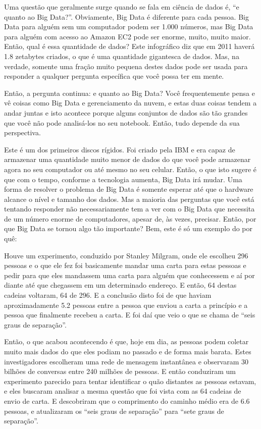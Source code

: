 \begin{multicols}{2}
\begin{footnotesize}
Uma questão que geralmente surge quando se fala em ciência de dados é, ``e quanto ao Big Data?''. Obviamente, Big Data é diferente para cada pessoa. Big Data para alguém sem um computador podem ser 1.000 números, mas Big Data para alguém com acesso ao Amazon EC2 pode ser enorme, muito, muito maior. Então, qual é essa quantidade de dados? Este infográfico diz que em 2011 haverá 1.8 zetabytes criados, o que é uma quantidade gigantesca de dados. Mas, na verdade, somente uma fração muito pequena destes dados pode ser usada para responder a qualquer pergunta específica que você possa ter em mente. 

Então, a pergunta continua: e quanto ao Big Data? Você frequentemente pensa e vê coisas como Big Data e gerenciamento da nuvem, e estas duas coisas tendem a andar juntas e isto acontece porque alguns conjuntos de dados são tão grandes que você não pode analisá-los no seu notebook. 
Então, tudo depende da sua perspectiva.

Este é um dos primeiros discos rígidos.
Foi criado pela IBM e era capaz de armazenar uma quantidade muito menor de dados do que você pode armazenar agora no seu computador ou até mesmo no seu celular. Então, o que isto sugere é que com o tempo, conforme a tecnologia aumenta, Big Data irá mudar. Uma forma de resolver o problema de Big Data é somente esperar até que o hardware alcance o nível e tamanho dos dados. Mas a maioria das perguntas que você está tentando responder não necessariamente tem a ver com o Big Data que necessita de um número enorme de computadores, apesar de, às vezes, precisar. Então, por que Big Data se tornou algo tão importante? Bem, este é só um exemplo do por quê:

Houve um experimento, conduzido por Stanley Milgram, onde ele escolheu 296 pessoas e o que ele fez foi basicamente mandar uma carta para estas pessoas e pedir para que eles mandassem uma carta para alguém que conhecessem e aí por diante até que chegassem em um determinado endereço. E então, 64 destas cadeias voltaram, 64 de 296. E a conclusão disto foi de que haviam aproximadamente 5.2 pessoas entre a pessoa que enviou a carta a princípio e a pessoa que finalmente recebeu a carta. E foi daí que veio o que se chama de ``seis graus de separação''.

Então, o que acabou acontecendo é que, hoje em dia, as pessoas podem coletar muito mais dados do que eles podiam no passado e de forma mais barata. Estes investigadores escolheram uma rede de mensagem instantânea e observaram 30 bilhões de conversas entre 240 milhões de pessoas. E então conduziram um experimento parecido para tentar identificar o quão distantes as pessoas estavam, e eles buscaram analisar a mesma questão que foi vista com as 64 cadeias de envio de carta. E descobriram que o comprimento do caminho médio era de 6.6 pessoas, e atualizaram os ``seis graus de separação'' para ``sete graus de separação''. 


\end{footnotesize}
\end{multicols}
